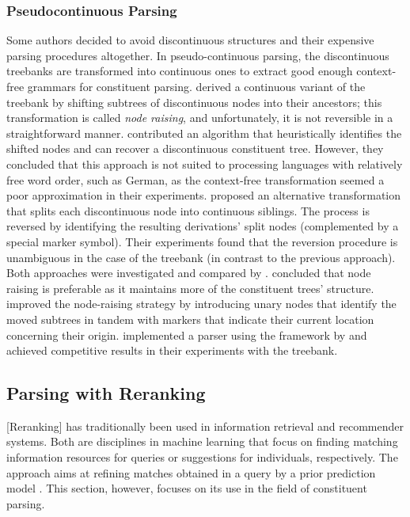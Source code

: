 \documentclass[../document.tex]{subfiles}
\begin{document}
    \subsubsection*{Pseudocontinuous Parsing}
    Some authors decided to avoid discontinuous structures and their expensive parsing procedures altogether.
    In pseudo-continuous parsing, the discontinuous treebanks are transformed into continuous ones to extract good enough context-free grammars for constituent parsing.
     derived a continuous variant of the \negra{} treebank by shifting subtrees of discontinuous nodes into their ancestors; this transformation is called \emph{node raising}, and unfortunately, it is not reversible in a straightforward manner.
     contributed an algorithm that heuristically identifies the shifted nodes and can recover a discontinuous constituent tree.
    However, they concluded that this approach is not suited to processing languages with relatively free word order, such as German, as the context-free transformation seemed a poor approximation in their experiments.
     proposed an alternative transformation that splits each discontinuous node into continuous siblings.
    The process is reversed by identifying the resulting derivations' split nodes (complemented by a special marker symbol).
    Their experiments found that the reversion procedure is unambiguous in the case of the \tiger{} treebank (in contrast to the previous approach).
    Both approaches were investigated and compared by \citet{hsu2010comparing}.
     concluded that node raising is preferable as it maintains more of the constituent trees' structure.
     improved the node-raising strategy by introducing unary nodes that identify the moved subtrees in tandem with markers that indicate their current location concerning their origin.
    \citeauthor{Ver16} implemented a parser using the  framework by \citet{Petrov06} and achieved competitive results in their experiments with the \tiger{} treebank.

    \subsection{Parsing with Reranking}\label{sec:references:reranking}
    [Reranking] has traditionally been used in information retrieval and recommender systems.
    Both are disciplines in machine learning that focus on finding matching information resources for queries or suggestions for individuals, respectively.
    The approach aims at refining matches obtained in a query by a prior prediction model \citep{carbonell1998use,adomavicius2009toward}.
    This section, however, focuses on its use in the field of constituent parsing.
\end{document}
